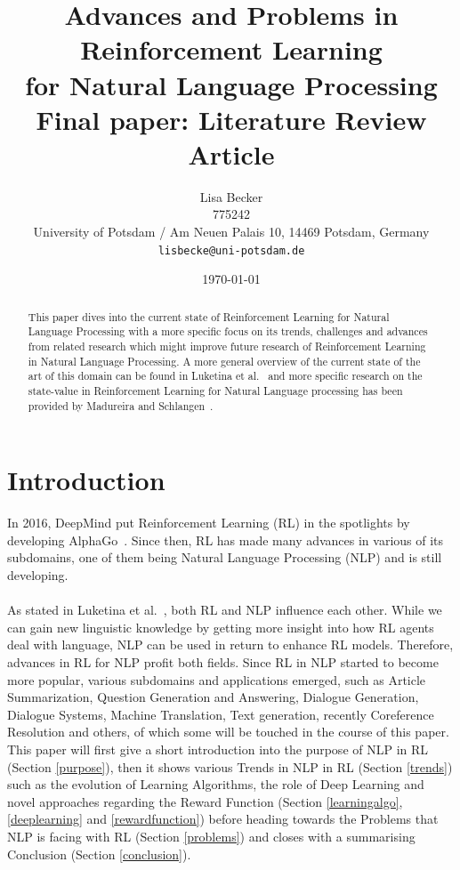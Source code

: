 \documentclass[11pt]{article}
\title{Advances and Problems in Reinforcement Learning \\for Natural Language Processing\\Final paper: Literature Review Article}
\author{Lisa Becker \\
        775242\\
        University of Potsdam / Am Neuen Palais 10, 14469 Potsdam, Germany \\
        {\tt lisbecke@uni-potsdam.de} \\}
\date{\today}
\begin{document}
\maketitle

\begin{abstract}
This paper dives into the current state of Reinforcement Learning for Natural Language Processing with a more specific focus on its trends, challenges and advances from related research which might improve future research of Reinforcement Learning in Natural Language Processing. A more general overview of the current state of the art of this domain can be found in Luketina et al.~ and more specific research on the state-value in Reinforcement Learning for Natural Language processing has been provided by Madureira and Schlangen~.
\end{abstract}


\section{Introduction}
In 2016, DeepMind put Reinforcement Learning (RL) in the spotlights by developing AlphaGo~\cite{alphago}. Since then, RL has made many advances in various of its subdomains, one of them being Natural Language Processing (NLP) and is still developing.\\\\ As stated in Luketina et al.~, both RL and NLP influence each other. While we can gain new linguistic knowledge by getting more insight into how RL agents deal with language, NLP can be used in return to enhance RL models. Therefore, advances in RL for NLP profit both fields. Since RL in NLP started to become more popular, various subdomains and applications emerged, such as Article Summarization, Question Generation and Answering, Dialogue Generation, Dialogue Systems, Machine Translation, Text generation, recently Coreference Resolution and others, of which some will be touched in the course of this paper. This paper will first give a short introduction into the purpose of NLP in RL (Section \ref{purpose}), then it shows various Trends in NLP in RL (Section \ref{trends}) such as the evolution of Learning Algorithms, the role of Deep Learning and novel approaches regarding the Reward Function (Section \ref{learningalgo}, \ref{deeplearning} and \ref{rewardfunction}) before heading towards the Problems that NLP is facing with RL (Section \ref{problems}) and closes with a summarising Conclusion (Section \ref{conclusion}).
\end{document}
